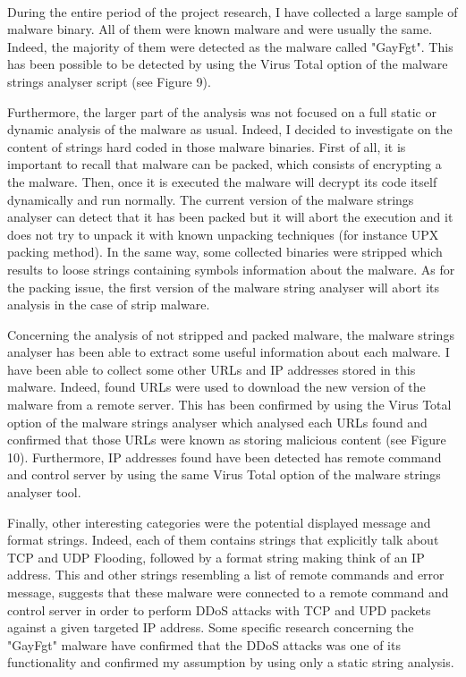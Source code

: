 \paragraph{} %

During the entire period of the project research, I have collected a large sample of malware
binary. All of them were known malware and were usually the same. Indeed, the majority of them
were detected as the malware called "GayFgt". This has been possible to be detected by using
the Virus Total option of the malware strings analyser script (see Figure 9).


Furthermore, the larger part of the analysis was not focused on a full static or dynamic 
analysis of the malware as usual. Indeed, I decided to investigate on the content of strings
hard coded in those malware binaries.
First of all, it is important to recall that malware can be packed, which consists of encrypting a the malware. Then, once it is executed the malware will decrypt its code itself dynamically
and run normally. The current version of the malware strings analyser can detect that it has
been packed but it will abort the execution and it does not try to unpack it with known
unpacking techniques (for instance UPX packing method). In the same way, some collected binaries
were stripped which results to loose strings containing symbols information about the malware.
As for the packing issue, the first version of the malware string analyser will abort its analysis
in the case of strip malware.

Concerning the analysis of not stripped and packed malware, the malware strings analyser has
been able to extract some useful information about each malware. I have been able
to collect some other URLs and IP addresses stored in this malware.
Indeed, found URLs were used to download the new version of the malware from a remote server.
This has been confirmed by using the Virus Total option of the malware strings analyser which
analysed each URLs found and confirmed that those URLs were known as storing malicious content
(see Figure 10).
Furthermore, IP addresses found have been detected has remote command and control server by
using the same Virus Total option of the malware strings analyser tool.


Finally, other interesting categories were the potential displayed message and format strings.
Indeed, each of them contains strings that explicitly talk about TCP and UDP Flooding, followed
by a format string making think of an IP address. This and other strings resembling a list
of remote commands and error message, suggests that these malware were connected to a 
remote command and control server in order to perform DDoS attacks with TCP and UPD packets
against a given targeted IP address. Some specific research concerning the "GayFgt" malware
have confirmed that the DDoS attacks was one of its functionality and confirmed my assumption
by using only a static string analysis.
